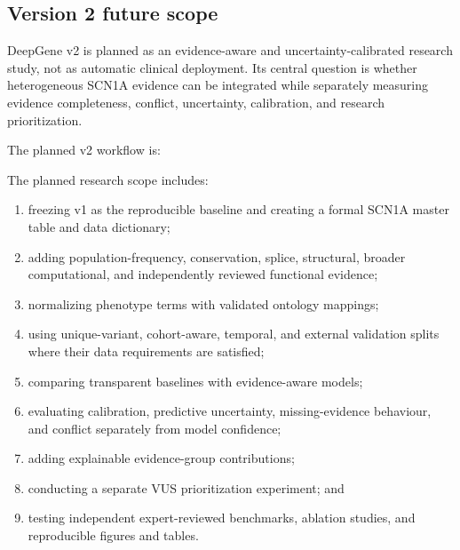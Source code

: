 \documentclass[12pt,a4paper]{article}
\begin{document}
\subsection{Version 2 future scope}
DeepGene v2 is planned as an evidence-aware and uncertainty-calibrated
research study, not as automatic clinical deployment. Its central question is
whether heterogeneous SCN1A evidence can be integrated while separately
measuring evidence completeness, conflict, uncertainty, calibration, and
research prioritization.

The planned v2 workflow is:
\begin{center}
\end{center}

The planned research scope includes:
\begin{enumerate}
\item freezing v1 as the reproducible baseline and creating a formal SCN1A
master table and data dictionary;
\item adding population-frequency, conservation, splice, structural, broader
computational, and independently reviewed functional evidence;
\item normalizing phenotype terms with validated ontology mappings;
\item using unique-variant, cohort-aware, temporal, and external validation
splits where their data requirements are satisfied;
\item comparing transparent baselines with evidence-aware models;
\item evaluating calibration, predictive uncertainty, missing-evidence
behaviour, and conflict separately from model confidence;
\item adding explainable evidence-group contributions;
\item conducting a separate VUS prioritization experiment; and
\item testing independent expert-reviewed benchmarks, ablation studies, and
reproducible figures and tables.
\end{enumerate}
\end{document}
